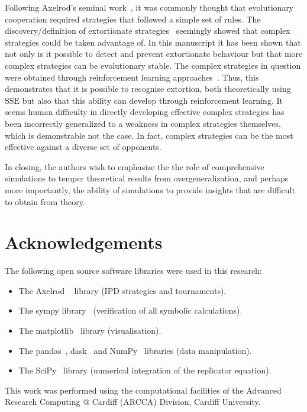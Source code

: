 \documentclass[a4paper]{article}
\newcommand{\SSe}{\text{SSE}}
\begin{document}
Following Axelrod's seminal work~\cite{Axelrod1980, Axelrod1980a}, it was
commonly thought that evolutionary cooperation required strategies that followed
a simple set of rules. The discovery/definition of extortionate
strategies~\cite{Press2012} seemingly showed that complex strategies could be
taken advantage of. In this manuscript it has been shown that not only is it
possible to detect and prevent extortionate behaviour but that more complex
strategies can be evolutionary stable. The complex strategies in question were
obtained through reinforcement learning approaches~\cite{Harper2017, Moran1707}.
Thus, this demonstrates that it is possible to recognise extortion, both
theoretically using \(\SSe\) but also that this ability can develop through
reinforcement learning. It seems human difficulty in directly developing
effective complex strategies has been incorrectly generalized to a weakness
in complex strategies themselves, which is demonstrable not the case. In fact,
complex strategies can be the most effective against a diverse set of opponents.

In closing, the authors wish to emphasize the the role of comprehensive simulations to temper
theoretical results from overgeneralization, and perhaps more importantly, the
ability of simulations to provide insights that are difficult to obtain from theory.

\section*{Acknowledgements}

The following open source software libraries were used in this research:

\begin{itemize}
    \item The Axelrod ~\cite{Knight2016, Knight2018} library (IPD strategies and
        tournaments).
    \item The sympy library~\cite{Meurer2017} (verification of all symbolic
        calculations).
    \item The matplotlib~\cite{Droettboom2018} library (visualisation).
    \item The pandas~\cite{Structures2010}, dask~\cite{Dask2016} and
        NumPy~\cite{Oliphant2015} libraries (data manipulation).
    \item The SciPy~\cite{Jones2001} library (numerical integration of the
        replicator equation).
\end{itemize}

This work was performed using the computational facilities of the Advanced
Research Computing @ Cardiff (ARCCA) Division, Cardiff University.

\printbibliography




\end{document}
